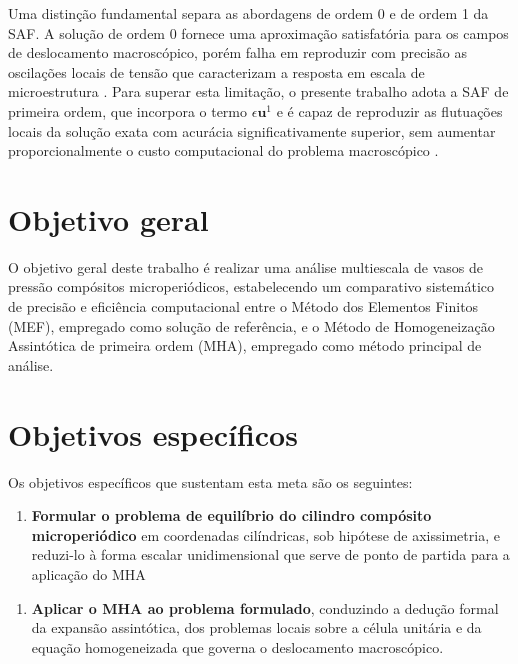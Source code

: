 Uma distinção fundamental separa as abordagens de ordem 0 e de ordem 1 da SAF. A solução de ordem 0 fornece uma aproximação satisfatória para os campos de deslocamento macroscópico, porém falha em reproduzir com precisão as oscilações locais de tensão que caracterizam a resposta em escala de microestrutura \cite{BrunaReport}. Para superar esta limitação, o presente trabalho adota a SAF de primeira ordem, que incorpora o termo $\epsilon \mathbf{u}^1$ e é capaz de reproduzir as flutuações locais da solução exata com acurácia significativamente superior, sem aumentar proporcionalmente o custo computacional do problema macroscópico \cite{BrunaReport}. 

\section{Objetivo geral}

O objetivo geral deste trabalho é realizar uma análise multiescala de
vasos de pressão compósitos microperiódicos,  estabelecendo um comparativo
sistemático de precisão e eficiência computacional entre o Método dos
Elementos Finitos (MEF), empregado como solução de referência, e o Método
de Homogeneização Assintótica de primeira ordem (MHA), empregado como
método principal de análise.

\section{Objetivos específicos}
Os objetivos específicos que sustentam esta meta são os seguintes:

\begin{enumerate}
  \item \textbf{Formular o problema de equilíbrio do cilindro compósito microperiódico}
  em coordenadas cilíndricas, sob hipótese de axissimetria, e reduzi-lo à
  forma escalar unidimensional que serve de ponto de partida para a
  aplicação do MHA %
\end{enumerate}

\begin{enumerate}
  \item \textbf{Aplicar o MHA ao problema formulado}, conduzindo a dedução formal da
  expansão assintótica, dos problemas locais sobre a célula unitária e da
  equação homogeneizada que governa o deslocamento macroscópico.
\end{enumerate}

